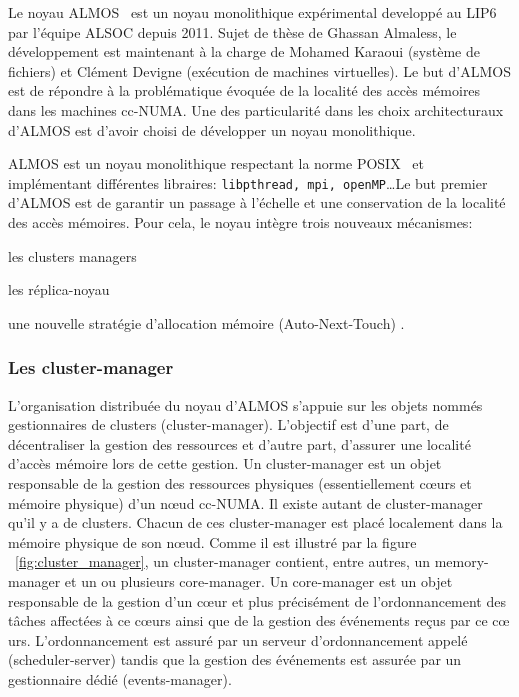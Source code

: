    Le noyau ALMOS~\cite{almaless2011almos} est un noyau monolithique
    expérimental developpé au LIP6 par l'équipe ALSOC depuis 2011. Sujet de
    thèse de Ghassan Almaless, le développement est maintenant à la charge de
    Mohamed Karaoui (système de fichiers) et Clément Devigne (exécution de
    machines virtuelles). Le but d'ALMOS est de répondre à la problématique
    évoquée de la localité des accès mémoires dans les machines
    cc-NUMA. Une des particularité dans les
    choix architecturaux d'ALMOS est d'avoir choisi de développer un noyau
    monolithique.

    ALMOS est un noyau monolithique respectant la norme POSIX~\cite{posix2013}
    et implémentant différentes libraires: \texttt{libpthread, mpi,
      openMP}\ldots Le but premier d'ALMOS est de garantir un passage à
    l'échelle et une conservation de la localité des accès mémoires. Pour cela,
    le noyau intègre trois nouveaux mécanismes: \benumline \item les clusters
    managers \item les réplica-noyau \item une nouvelle stratégie d'allocation
    mémoire (Auto-Next-Touch) \eenumline.

    
    \subsubsection{Les cluster-manager}

      L'organisation distribuée du noyau d’ALMOS s’appuie sur les objets nommés
      gestionnaires de clusters (cluster-manager). L’objectif est d’une part, de
      décentraliser la gestion des ressources et d’autre part, d’assurer une
      localité d’accès mémoire lors de cette gestion. Un cluster-manager est un
      objet responsable de la gestion des ressources physiques (essentiellement
      c\oe urs et mémoire physique) d’un nœud cc-NUMA. Il existe autant de
      cluster-manager qu’il y a de clusters. Chacun de ces cluster-manager est
      placé localement dans la mémoire physique de son n\oe ud. Comme il est
      illustré par la figure ~\ref{fig:cluster_manager}, un cluster-manager
      contient, entre autres, un memory-manager et un ou plusieurs core-manager.
      Un core-manager est un objet responsable de la gestion d’un c\oe ur et
      plus précisément de l'ordonnancement des tâches affectées à ce c\oe urs
      ainsi que de la gestion des événements reçus par ce c\oe
      urs. L'ordonnancement est assuré par un serveur d'ordonnancement appelé
      (scheduler-server) tandis que la gestion des événements est assurée par un
      gestionnaire dédié (events-manager).

